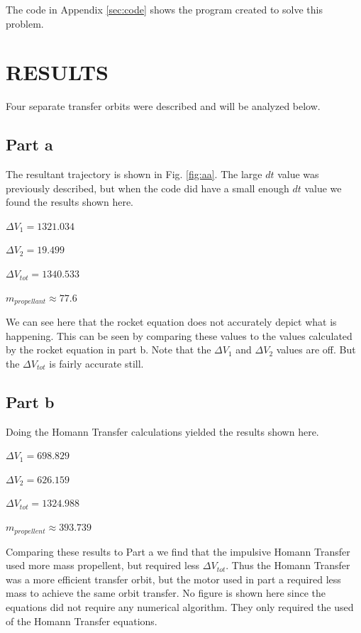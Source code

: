 \documentclass[cleanfoot,cleanhead,onecolumn,10pt,notitlepage]{asme2e}
\begin{document}
The code in Appendix \ref{sec:code} shows the program created to solve this problem.  

\section{RESULTS}

Four separate transfer orbits were described and will be analyzed below.

\subsection{Part a}

The resultant trajectory is shown in Fig. \ref{fig:aa}.  The large $dt$ value was previously described, but when the code did have a small enough $dt$ value we found the results shown here.

$\Delta V_1 = 1321.034$

$\Delta V_2 = 19.499$

$\Delta V_{tot} = 1340.533$

$m_{propellant} \approx 77.6$ 

We can see here that the rocket equation does not accurately depict what is happening.  This can be seen by comparing these values to the values calculated by the rocket equation in part b.  Note that the $\Delta V_1$ and $\Delta V_2$ values are off.  But the $\Delta V_{tot}$ is fairly accurate still.
 


\subsection{Part b}

Doing the Homann Transfer calculations yielded the results shown here.

$\Delta V_1 = 698.829$

$\Delta V_2 = 626.159$

$\Delta V_{tot} = 1324.988$

$m_{propellent} \approx 393.739$

Comparing these results to Part a we find that the impulsive Homann Transfer used more mass propellent, but required less $\Delta V_{tot}$.  Thus the Homann Transfer was a more efficient transfer orbit, but the motor used in part a required less mass to achieve the same orbit transfer.  No figure is shown here since the equations did not require any numerical algorithm.  They only required the used of the Homann Transfer equations.
\end{document}

